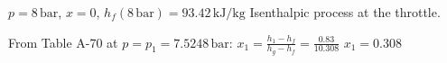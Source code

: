 \( p = 8 \, \text{bar} \), \( x = 0 \), \( h_f(8 \, \text{bar}) = 93.42 \, \text{kJ/kg} \)  
Isenthalpic process at the throttle.  

From Table A-70 at \( p = p_1 = 7.5248 \, \text{bar} \):  
\( x_1 = \frac{h_1 - h_f}{h_g - h_f} = \frac{0.83}{10.308} \)  
\( x_1 = 0.308 \)